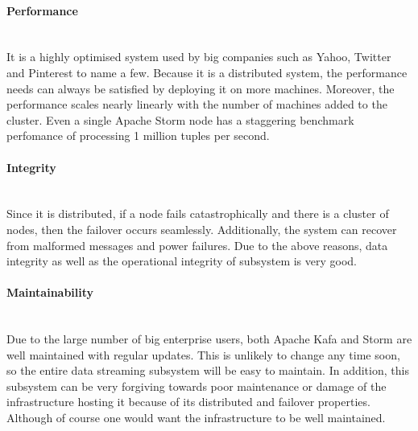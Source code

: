 \paragraph{Performance}
\mbox{}\\
It is a highly optimised system used by big companies such as Yahoo, Twitter and Pinterest to name a few. Because it is a distributed system, the performance needs can always be satisfied by deploying it on more machines. Moreover, the performance scales nearly linearly with the number of machines added to the cluster. Even a single Apache Storm node has a staggering benchmark perfomance of processing 1 million tuples per second.
\paragraph{Integrity}
\mbox{}\\
Since it is distributed, if a node fails catastrophically and there is a cluster of nodes, then the failover occurs seamlessly. Additionally, the system can recover from malformed messages and power failures. Due to the above reasons, data integrity as well as the operational integrity of subsystem is very good.
\paragraph{Maintainability}
\mbox{}\\
Due to the large number of big enterprise users, both Apache Kafa and Storm are well maintained with regular updates. This is unlikely to change any time soon, so the entire data streaming subsystem will be easy to maintain. In addition, this subsystem can be very forgiving towards poor maintenance or damage of the infrastructure hosting it because of its distributed and failover properties. Although of course one would want the infrastructure to be well maintained.
